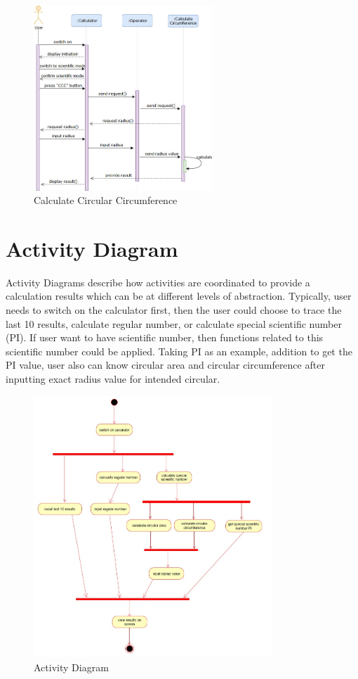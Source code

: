 \begin{figure}[H]
\centering  %
\includegraphics[width=0.6\textwidth]{images/SD/ccc.jpg}
\caption{Calculate Circular Circumference}
\end{figure}



\vspace{50pt}
\section{Activity Diagram}

\begin{flushleft}
\vspace{8pt}
\noindent
Activity Diagrams describe how activities are coordinated to provide a calculation results which can be at different levels of abstraction. Typically, user needs to switch on the calculator first, then the user could choose to trace the last 10 results, calculate regular number, or calculate special scientific number (PI). If user want to have scientific number, then functions related to this scientific number could be applied. Taking PI as an example, addition to get the PI value, user also can know circular area and circular circumference after inputting exact radius value for intended circular.
\end{flushleft}


\begin{figure}[H]
\centering  %
\includegraphics[width=0.8\textwidth]{images/activity_diagram.jpg}
\caption{Activity Diagram}
\end{figure}



